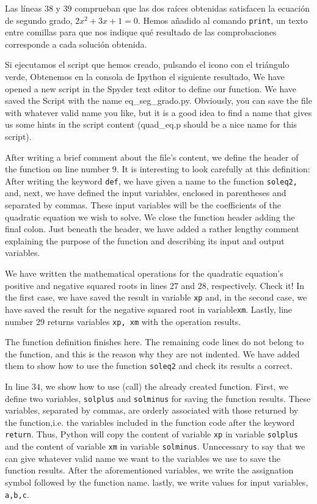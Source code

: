 \begin{paracol}{2}
     Las líneas $38$ y $39$ comprueban que las dos raíces obtenidas satisfacen la ecuación de segundo grado, $2x^2+3x+1 = 0$. Hemos añadido al comando \texttt{print}, un texto entre comillas para que nos indique qué resultado de las comprobaciones corresponde a cada solución obtenida.

     Si ejecutamos el script que hemos creado, pulsando el icono con el triángulo verde, Obtenemos en la consola de Ipython el siguiente resultado,
     \switchcolumn
     We have opened a new script in the Spyder text editor to define our function. We have saved the Script with the name {eq\_seg\_grado.py}. Obviously, you can save the file with whatever valid name you like, but it is a good idea to find a name that gives us some hints in the script content (quad\_eq.p should be a nice name for this script). 

     After writing a brief comment about the file's content, we define the header of the function on line number $9$. It is interesting to look carefully at this definition: After writing the keyword \texttt{def}, we have given a name to the function \texttt{soleq2,} and, next, we have defined the input variables, enclosed in parentheses and separated by commas. These input variables will be the coefficients of the quadratic equation we wish to solve. We close the function header adding the final colon. Just beneath the header, we have added a rather lengthy comment explaining the purpose of the function and describing its input and output variables.

     We have written the mathematical operations for the quadratic equation's positive and negative squared roots in lines 27 and 28, respectively. Check it! In the first case, we have saved the result in variable \texttt{xp} and, in the second case, we have saved the result for the negative squared root in variable\texttt{xm}. Lastly, line number $29$ returns variables \texttt{xp, xm} with the operation results.

     The function definition finishes here. The remaining code lines do not belong to the function, and this is the reason why they are not indented. We have added them to show how to use the function \texttt{soleq2} and check its results a correct.

     In line $34$, we show how to use (call) the already created function. First, we define two variables, \texttt{solplus} and \texttt{solminus} for saving the function results.
     These variables, separated by commas, are orderly associated with those returned by the function,i.e. the variables included in the function code after the keyword \texttt{return}. Thus, Python will copy the content of variable \texttt{xp} in variable \texttt{solplus} and the content of variable \texttt{xm} in variable \texttt{solminus}. Unnecessary to say that we can give whatever valid name we want to the variables we use to save the function results. After the aforementioned variables, we write the assignation symbol followed by the function name. lastly, we write values for input variables, \texttt{a,b,c}.


\end{paracol}
